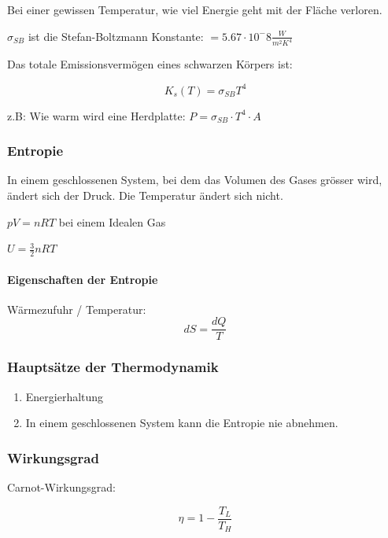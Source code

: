\documentclass[a4paper]{scrartcl}
\begin{document}
Bei einer gewissen Temperatur, wie viel Energie geht mit der Fläche verloren.

$\sigma_{SB}$ ist die Stefan-Boltzmann Konstante: $=5.67 \cdot 10^-8 \frac{W}{m^2 K^4}$

Das totale Emissionsvermögen eines schwarzen Körpers ist:

\[
	K_s(T) = \sigma_{SB} T^4
\]

z.B: Wie warm wird eine Herdplatte: $P = \sigma_{SB} \cdot T^4 \cdot A$

 
\subsubsection{Entropie}

In einem geschlossenen System, bei dem das Volumen des Gases grösser wird, ändert sich der Druck. Die Temperatur ändert sich nicht.

$pV = nRT$ bei einem Idealen Gas

$U = \frac{3}{2} nRT$


\paragraph{Eigenschaften der Entropie}

Wärmezufuhr / Temperatur:
\[
	dS = \frac{dQ}{T}
\]

\subsubsection{Hauptsätze der Thermodynamik}

\begin{enumerate}
	\item Energierhaltung
	\item In einem geschlossenen System kann die Entropie nie abnehmen.
\end{enumerate}


\subsubsection{Wirkungsgrad}

Carnot-Wirkungsgrad:

\[
	\eta = 1 - \frac{T_L}{T_H}
\]
\end{document}
